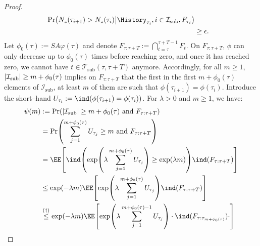 \documentclass[preprint,cleveref,12pt]{colt2025}
\DeclarePairedDelimiter{\brackets}{[}{]}	%
\DeclarePairedDelimiter{\parens}{(}{)}	%
\DeclarePairedDelimiter{\abs}{\lvert}{\rvert}	%
\newcommand{\indic}[1]{\ind\parens{#1}}
\def\indicator{\indic}
\newcommand{\eqindicator}[1]{\ind\parens*{#1}}
\begin{document}
\begin{proof}
\begin{align*}
{\begin{array}{c}
                \end{array}
            }
            \Pr \parens*{
                N_z(\tau_{i+1}) > N_z(\tau_i)
                \middle |
                \History_{\tau_i}, i \in \mathcal{I}_\mathrm{sub}, F_{\tau_i}
            }
            \\
            & \ge 
            \epsilon
            .
        \end{align*}
        Let $\phi_0(\tau) := S A \varphi(\tau)$ and denote $F_{\tau:\tau+T} := \bigcap_{t=\tau}^{\tau+T-1} F_t$.
        On $F_{\tau:\tau+T}$, $\phi$ can only decrease up to $\phi_0(\tau)$ times before reaching zero, and once it has reached zero, we cannot have $t \in \mathcal{T}_\mathrm{sub}(\tau, \tau+T)$ anymore. 
        Accordingly, for all $m \ge 1$, $\abs*{\mathcal{I}_\mathrm{sub}} \ge m + \phi_0(\tau)$ implies on $F_{\tau:\tau+T}$ that the first in the first $m + \phi_0(\tau)$ elements of $\mathcal{I}_\mathrm{sub}$, at least $m$ of them are such that $\phi(\tau_{i+1}) = \phi(\tau_i)$.
        Introduce the short--hand $U_{\tau_i} := \indicator{\phi(\tau_{i+1}) = \phi(\tau_i)}$.
        For $\lambda > 0$ and $m \ge 1$, we have:
        \begin{align*}
            \psi(m) 
            & :=
            \Pr\parens*{
                \abs*{\mathcal{I}_\mathrm{sub}} \ge m + \phi_0(\tau)
                \text{~and~} F_{\tau:\tau+T}
            }
            \\
            & = 
            \Pr \parens*{
                \sum_{j=1}^{m + \phi_0(\tau)} U_{\tau_j} \ge m
                \text{~and~} F_{\tau:\tau+T}
            }
            \\
            & = \EE \brackets*{
                \eqindicator{
                    \exp\parens*{\lambda\sum_{j=1}^{m + \phi_0(\tau)} U_{\tau_j}}
                    \ge
                    \exp(\lambda m)
                }
                \indicator{F_{\tau:\tau+T}}
            }
            \\
            & \le 
            \exp(- \lambda m)
            \EE \brackets*{
                \exp\parens*{\lambda\sum_{j=1}^{m + \phi_0(\tau)} U_{\tau_j}}
                \indicator{F_{\tau:\tau+T}}
            }
            \\
            & \overset{(\dagger)}\le 
            \exp(- \lambda m)
            \EE \brackets*{
                \exp\parens*{\lambda\sum_{j=1}^{m + \phi_0(\tau)-1} U_{\tau_j}}
                \cdot
                {
                    \indicator{F_{\tau:\tau_{m+\phi_0(\tau)}}}
                    \cdot
}}
\end{align*}
\end{proof}
\end{document}
